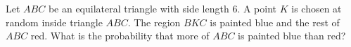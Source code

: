 Let $ABC$ be an equilateral triangle with side length $6$. A point $K$ is chosen at random inside triangle $ABC$. The region $BKC$ is painted blue and the rest of $ABC$ red. What is the probability that more of $ABC$ is painted blue than red?

